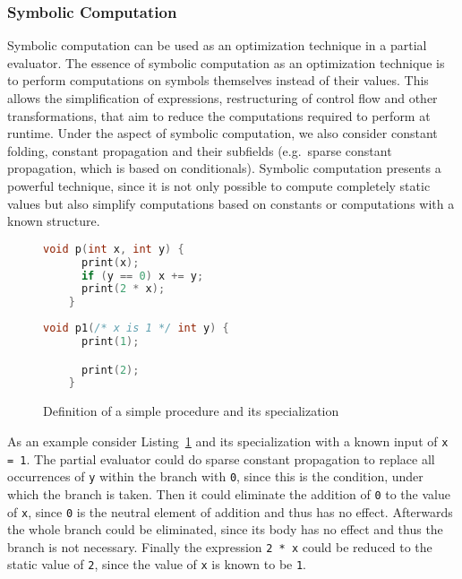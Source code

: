 \subsubsection*{Symbolic Computation}

Symbolic computation can be used as an optimization technique in a partial evaluator.
The essence of symbolic computation as an optimization technique is to perform computations on symbols themselves instead of their values.
This allows the simplification of expressions, restructuring of control flow and other transformations, that aim to reduce the computations required to perform at runtime.
Under the aspect of symbolic computation, we also consider constant folding, constant propagation and their subfields (e.g.\ sparse constant propagation, which is based on conditionals).
Symbolic computation presents a powerful technique, since it is not only possible to compute completely static values but also simplify computations based on constants or computations with a known structure.

\begin{figure}[h]
  \setcounter{figure}{0}
  \setcounter{lstlisting}{1}
  \renewcommand\figurename{Listing}
\noindent\begin{minipage}{.45\textwidth}
  \begin{lstlisting}[language=c,autogobble=true]
    void p(int x, int y) {
      print(x);
      if (y == 0) x += y;
      print(2 * x);
    }
  \end{lstlisting}
\end{minipage}\hfill
\begin{minipage}{.45\textwidth}
  \begin{lstlisting}[language=c,autogobble=true]
    void p1(/* x is 1 */ int y) {
      print(1);

      print(2);
    }
  \end{lstlisting}
\end{minipage}
  \caption{Definition of a simple procedure and its specialization}\label{lst:symbolic-computation}
\end{figure}


As an example consider Listing~\ref{lst:symbolic-computation} and its specialization with a known input of \texttt{x = 1}.
The partial evaluator could do sparse constant propagation to replace all occurrences of \texttt{y} within the branch with \texttt{0}, since this is the condition, under which the branch is taken.
Then it could eliminate the addition of \texttt{0} to the value of \texttt{x}, since \texttt{0} is the neutral element of addition and thus has no effect.
Afterwards the whole branch could be eliminated, since its body has no effect and thus the branch is not necessary.
Finally the expression \texttt{2 * x} could be reduced to the static value of \texttt{2}, since the value of \texttt{x} is known to be \texttt{1}.


